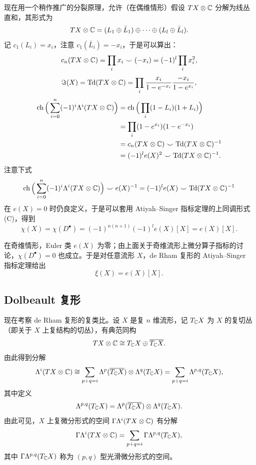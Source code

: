 现在用一个稍作推广的分裂原理，允许（在偶维情形）假设 $TX\otimes\mathbb{C}$ 分解为线丛直和，其形式为
\[
TX\otimes\mathbb{C}=(L_1\oplus\bar L_1)\oplus\cdots\oplus(L_l\oplus\bar L_l).
\]
记 $c_1(L_i)=x_i$，注意 $c_1(\bar L_i)=-x_i$，于是可以算出：
\[
c_n(TX\otimes\mathbb{C})=\prod_i x_i\smile(-x_i)=(-1)^l\prod_i x_i^2,
\]
\[
\Im(X)=\operatorname{Td}(TX\otimes\mathbb{C})=\prod_i\frac{x_i}{1-e^{-x_i}}\frac{-x_i}{1-e^{x_i}},
\]
\[
\begin{aligned}
\operatorname{ch}\Big(\sum_{i=0}^n(-1)^i\Lambda^i(TX\otimes\mathbb{C})\Big)
&=\operatorname{ch}\Big(\prod_i(1-L_i)(1+L_i)\Big)\\
&=\prod_i(1-e^{x_i})(1-e^{-x_i})\\
&=c_n(TX\otimes\mathbb{C})\smile\operatorname{Td}(TX\otimes\mathbb{C})^{-1}\\
&=(-1)^le(X)^2\smile\operatorname{Td}(TX\otimes\mathbb{C})^{-1}.
\end{aligned}
\]
注意下式
\[
\operatorname{ch}\Big(\sum_{i=0}^n(-1)^i\Lambda^i(TX\otimes\mathbb{C})\Big)\smile e(X)^{-1}
=(-1)^le(X)\smile\operatorname{Td}(TX\otimes\mathbb{C})^{-1}
\]
在 $e(X)=0$ 时仍良定义，于是可以套用 Atiyah--Singer 指标定理的上同调形式 (C)，得到
\[
\chi(X)=\chi(D^\bullet)=(-1)^{n(n+1)}(-1)^le(X)[X]=e(X)[X].
\]


在奇维情形，Euler 类 $e(X)$ 为零；由上面关于奇维流形上微分算子指标的讨论，$\chi(D^\bullet)=0$ 也成立。于是对任意流形 $X$，de Rham 复形的 Atiyah--Singer 指标定理给出
\[
\xi(X)=e(X)[X].
\]

\subsection{Dolbeault 复形}

现在考察 de Rham 复形的复类比。设 $X$ 是复 $n$ 维流形，记 $T_{\mathbb{C}} X$ 为 $X$ 的复切丛（即关于 $X$ 上复结构的切丛），有典范同构
\[
TX\otimes\mathbb{C}\cong T_{\mathbb{C}} X\oplus\overline{T_{\mathbb{C}} X}.
\]
由此得到分解
\[
\Lambda^i(TX\otimes\mathbb{C})\cong\sum_{p+q=i}\Lambda^p(\overline{T_{\mathbb{C}} X})\otimes\Lambda^q(T_{\mathbb{C}} X)
=\sum_{p+q=i}\Lambda^{p,q}(T_{\mathbb{C}} X),
\]
其中定义
\[
\Lambda^{p,q}(T_{\mathbb{C}} X)=\Lambda^p(\overline{T_{\mathbb{C}} X})\otimes\Lambda^q(T_{\mathbb{C}} X).
\]
由此可见，$X$ 上复微分形式的空间 $\Gamma\Lambda^i(TX\otimes\mathbb{C})$ 有分解
\[
\Gamma\Lambda^i(TX\otimes\mathbb{C})=\sum_{p+q=i}\Gamma\Lambda^{p,q}(T_{\mathbb{C}} X),
\]
其中 $\Gamma\Lambda^{p,q}(T_{\mathbb{C}} X)$ 称为 $(p,q)$ 型光滑微分形式的空间。

